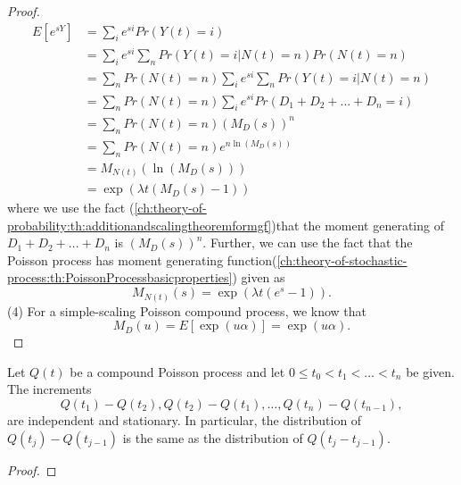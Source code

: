 \begin{refsection}
\begin{proof}
\begin{align*}
	E[e^{sY}] &= \sum_{i} e^{si}Pr(Y(t) = i) \\
	&=\sum_{i} e^{si}\sum_{n}Pr(Y(t) = i|N(t) = n)Pr(N(t) = n)\\
	&=\sum_n Pr(N(t) = n)\sum_{i} e^{si}\sum_{n}Pr(Y(t) = i|N(t) = n)\\
	&=\sum_n Pr(N(t) = n)\sum_{i} e^{si}Pr(D_1+D_2+...+D_n = i)\\
	&=\sum_n Pr(N(t) = n)(M_D(s))^n\\
	&=\sum_n Pr(N(t) = n)e^{n\ln(M_D(s))}\\
	&=M_{N(t)}(\ln(M_D(s))) \\
	&=\exp(\lambda t(M_D(s)-1))
	\end{align*}
	where we use the fact (\autoref{ch:theory-of-probability:th:additionandscalingtheoremformgf})that the moment generating of $D_1+D_2+...+D_n$ is $(M_D(s))^n$.
	Further, we can use the fact that the Poisson process has moment generating function(\autoref{ch:theory-of-stochastic-process:th:PoissonProcessbasicproperties}) given as
	$$M_{N(t)}(s) = \exp(\lambda t(e^s-1)).$$
	(4)
	For a simple-scaling Poisson compound process, we know that $$M_D(u) = E[\exp(u\alpha)] = \exp(u\alpha). $$
\end{proof}


\begin{lemma}\cite[470]{shreve2004stochastic2}\label{ch:theory-of-stochastic-process:compensatedPoissonProcessIsAMartingale}
	Let $Q(t)$ be a compound Poisson process and let $0 \leq t_0 < t_1 < \dots < t_n$ be given. The increments
	$$Q(t_1)-Q(t_2),Q(t_2)-Q(t_1),\dots,Q(t_n)-Q(t_{n-1}),$$
	are independent and stationary. In particular, the distribution of $Q(t_j) - Q(t_{j-1})$ is the same as the distribution of $Q(t_j - t_{j-1})$.
\end{lemma}
\begin{proof}
	
\end{proof}








\end{refsection}
